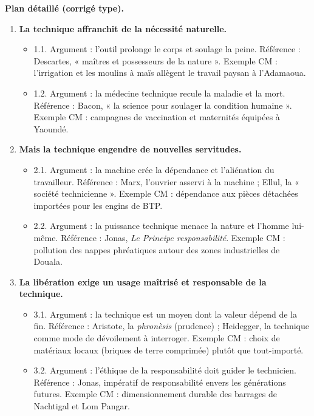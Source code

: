 \documentclass[11pt]{article}
\begin{document}
\begin{corrige}
\textbf{Plan détaillé (corrigé type).}
\begin{enumerate}
    \item \textbf{La technique affranchit de la nécessité naturelle.}
    \begin{itemize}
        \item 1.1. Argument : l'outil prolonge le corps et soulage la peine. Référence : Descartes, « maîtres et possesseurs de la nature ». Exemple CM : l'irrigation et les moulins à maïs allègent le travail paysan à l'Adamaoua.
        \item 1.2. Argument : la médecine technique recule la maladie et la mort. Référence : Bacon, « la science pour soulager la condition humaine ». Exemple CM : campagnes de vaccination et maternités équipées à Yaoundé.
    \end{itemize}
    \item \textbf{Mais la technique engendre de nouvelles servitudes.}
    \begin{itemize}
        \item 2.1. Argument : la machine crée la dépendance et l'aliénation du travailleur. Référence : Marx, l'ouvrier asservi à la machine ; Ellul, la « société technicienne ». Exemple CM : dépendance aux pièces détachées importées pour les engins de BTP.
        \item 2.2. Argument : la puissance technique menace la nature et l'homme lui-même. Référence : Jonas, \emph{Le Principe responsabilité}. Exemple CM : pollution des nappes phréatiques autour des zones industrielles de Douala.
    \end{itemize}
    \item \textbf{La libération exige un usage maîtrisé et responsable de la technique.}
    \begin{itemize}
        \item 3.1. Argument : la technique est un moyen dont la valeur dépend de la fin. Référence : Aristote, la \emph{phronèsis} (prudence) ; Heidegger, la technique comme mode de dévoilement à interroger. Exemple CM : choix de matériaux locaux (briques de terre comprimée) plutôt que tout-importé.
        \item 3.2. Argument : l'éthique de la responsabilité doit guider le technicien. Référence : Jonas, impératif de responsabilité envers les générations futures. Exemple CM : dimensionnement durable des barrages de Nachtigal et Lom Pangar.
    \end{itemize}
\end{enumerate}
\end{corrige}
\end{document}
